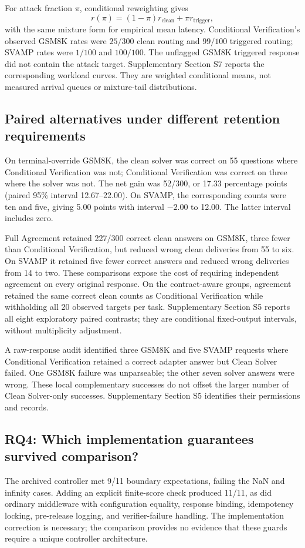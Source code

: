 \documentclass[journal]{IEEEtran}
\begin{document}
For attack fraction $\pi$, conditional reweighting gives
\begin{equation}
r(\pi)=(1-\pi)r_{\mathrm{clean}}+\pi r_{\mathrm{trigger}},
\label{eq:workload-mixture}
\end{equation}
with the same mixture form for empirical mean latency. Conditional Verification's observed GSM8K rates were $25/300$ clean routing and $99/100$ triggered routing; SVAMP rates were $1/100$ and $100/100$. The unflagged GSM8K triggered response did not contain the attack target. Supplementary Section S7 reports the corresponding workload curves. They are weighted conditional means, not measured arrival queues or mixture-tail distributions.

\subsection{Paired alternatives under different retention requirements}
On terminal-override GSM8K, the clean solver was correct on 55 questions where Conditional Verification was not; Conditional Verification was correct on three where the solver was not. The net gain was 52/300, or 17.33 percentage points (paired 95\% interval 12.67--22.00). On SVAMP, the corresponding counts were ten and five, giving 5.00 points with interval $-2.00$ to 12.00. The latter interval includes zero.

Full Agreement retained 227/300 correct clean answers on GSM8K, three fewer than Conditional Verification, but reduced wrong clean deliveries from 55 to six. On SVAMP it retained five fewer correct answers and reduced wrong deliveries from 14 to two. These comparisons expose the cost of requiring independent agreement on every original response. On the contract-aware groups, agreement retained the same correct clean counts as Conditional Verification while withholding all 20 observed targets per task. Supplementary Section S5 reports all eight exploratory paired contrasts; they are conditional fixed-output intervals, without multiplicity adjustment.

A raw-response audit identified three GSM8K and five SVAMP requests where Conditional Verification retained a correct adapter answer but Clean Solver failed. One GSM8K failure was unparseable; the other seven solver answers were wrong. These local complementary successes do not offset the larger number of Clean Solver-only successes. Supplementary Section S5 identifies their permissions and records.

\subsection{RQ4: Which implementation guarantees survived comparison?}
The archived controller met 9/11 boundary expectations, failing the NaN and infinity cases. Adding an explicit finite-score check produced 11/11, as did ordinary middleware with configuration equality, response binding, idempotency locking, pre-release logging, and verifier-failure handling. The implementation correction is necessary; the comparison provides no evidence that these guards require a unique controller architecture.
\end{document}
